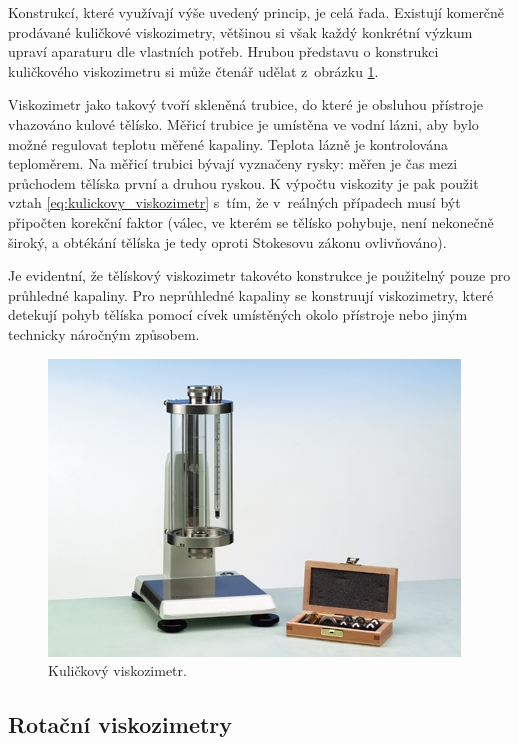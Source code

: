 \documentclass[12pt]{article}
\begin{document}
Konstrukcí, které využívají výše uvedený princip, je celá řada. Existují komerčně prodávané kuličkové viskozimetry, většinou si však každý konkrétní výzkum upraví aparaturu dle vlastních potřeb. Hrubou představu o konstrukci kuličkového viskozimetru si může čtenář udělat z~obrázku \ref{fig:kuličkový_viskozimetr}.
\par\noindent
Viskozimetr jako takový tvoří skleněná trubice, do které je obsluhou přístroje vhazováno kulové tělísko. Měřicí trubice je umístěna ve vodní lázni, aby bylo možné regulovat teplotu měřené kapaliny. Teplota lázně je kontrolována teploměrem. Na měřicí trubici bývají vyznačeny rysky: měřen je čas mezi průchodem tělíska první a druhou ryskou. K výpočtu viskozity je pak použit vztah \ref{eq:kulickovy_viskozimetr} s~tím, že v~reálných případech musí být připočten korekční faktor (válec, ve kterém se tělísko pohybuje, není nekonečně široký, a obtékání tělíska je tedy oproti Stokesovu zákonu ovlivňováno).
\par\noindent
Je evidentní, že tělískový viskozimetr takovéto konstrukce je použitelný pouze pro průhledné kapaliny. Pro neprůhledné kapaliny se konstruují viskozimetry, které detekují pohyb tělíska pomocí cívek umístěných okolo přístroje nebo jiným technicky náročným způsobem.~\cite{thesis:vysokotlaky_viskozimetr}
\begin{figure}
    \centering
    \includegraphics[width = 0.75\linewidth]{figures/kuličkový viskozimetr.jpg}
    \caption{Kuličkový viskozimetr.~\cite{Figure:kulickovy_viskozimetr}}
    \label{fig:kuličkový_viskozimetr}
\end{figure}

\subsection{Rotační viskozimetry}%
\end{document}
